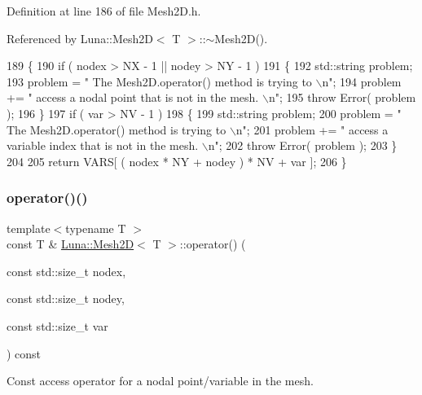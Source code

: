 Definition at line 186 of file Mesh2\+D.\+h.



Referenced by Luna\+::\+Mesh2\+D$<$ T $>$\+::$\sim$\+Mesh2\+D().


\begin{DoxyCode}
189   \{
190     \textcolor{keywordflow}{if} ( nodex > NX - 1 || nodey > NY - 1 )
191     \{
192       std::string problem;
193       problem = \textcolor{stringliteral}{" The Mesh2D.operator() method is trying to \(\backslash\)n"};
194       problem += \textcolor{stringliteral}{" access a nodal point that is not in the mesh. \(\backslash\)n"};
195       \textcolor{keywordflow}{throw} Error( problem );
196     \}
197     \textcolor{keywordflow}{if} ( var > NV - 1 )
198     \{
199       std::string problem;
200       problem = \textcolor{stringliteral}{" The Mesh2D.operator() method is trying to \(\backslash\)n"};
201       problem += \textcolor{stringliteral}{" access a variable index that is not in the mesh. \(\backslash\)n"};
202       \textcolor{keywordflow}{throw} Error( problem );
203     \}
204 
205     \textcolor{keywordflow}{return} VARS[ ( nodex * NY + nodey ) * NV + var ];
206   \}
\end{DoxyCode}
\mbox{\label{classLuna_1_1Mesh2D_aff8f62c9cc1c67b973f9d3531bb94e9b}} 
\subsubsection{\texorpdfstring{operator()()}{operator()()}\hspace{0.1cm}{\footnotesize\ttfamily [2/2]}}
{\footnotesize\ttfamily template$<$typename T $>$ \\
const T \& \hyperlink{classLuna_1_1Mesh2D}{Luna\+::\+Mesh2D}$<$ T $>$\+::operator() (\begin{DoxyParamCaption}\item[{const std\+::size\+\_\+t}]{nodex,  }\item[{const std\+::size\+\_\+t}]{nodey,  }\item[{const std\+::size\+\_\+t}]{var }\end{DoxyParamCaption}) const\hspace{0.3cm}{\ttfamily [inline]}}



Const access operator for a nodal point/variable in the mesh. 



